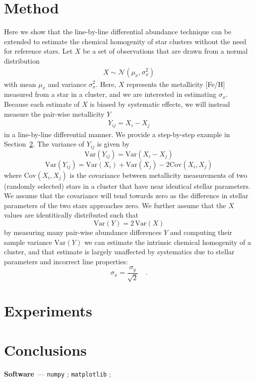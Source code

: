 \documentclass[modern]{aastex631}
\renewcommand{\paragraph}[1]{\medskip\par\noindent\textbf{#1}~---}
\begin{document}
\section{Method} \label{sec:method}
Here we show that the line-by-line differential abundance technique can be extended to estimate the chemical homogenity of star clusters without the need for reference stars. Let ${X}$ be a set of observations that are drawn from a normal distribution
\begin{eqnarray}
   X \sim \mathcal{N}(\mu_x, \sigma_x^2)
\end{eqnarray}
\noindent{}with mean $\mu_x$ and variance $\sigma_x^2$. Here, $X$ represents the metallicity [Fe/H] measured from a star in a cluster, and we are interested in estimating $\sigma_x$. Because each estimate of $X$ is biased by systematic effects, we will instead measure the pair-wise metallicity $Y$
\begin{eqnarray}
    Y_{ij} = X_i - X_j
\end{eqnarray}
\noindent{}in a line-by-line differential manner. We provide a step-by-step example in Section~\ref{sec:experiments}. The variance of $Y_{ij}$ is given by
\begin{equation}
    \mathrm{Var}(Y_{ij}) = \mathrm{Var}(X_i - X_j)
\end{equation}
\begin{equation}
    \mathrm{Var}(Y_{ij}) = \mathrm{Var}(X_i) + \mathrm{Var}(X_j) - 2\mathrm{Cov}(X_i,X_j)
\end{equation}
\noindent{}where $\mathrm{Cov}(X_i,X_j)$ is the covariance between metallicity measurements of two (randomly selected) stars in a cluster that have near identical stellar parameters. We assume that the covariance will tend towards zero as the difference in stellar parameters of the two stars approaches zero. We further assume that the $X$ values are identitically distributed such that 
\begin{equation}
    \mathrm{Var}(Y) = 2\,\mathrm{Var}(X)
\end{equation}
\noindent{}by measuring many pair-wise abundance differences $Y$ and computing their sample variance $\mathrm{Var}(Y)$ we can estimate the intrinsic chemical homogenity of a cluster, and that estimate is largely unaffected by systematics due to stellar parameters and incorrect line properties:
\begin{equation}
    \sigma_x = \frac{\sigma_y}{\sqrt{2}} \quad .
    \label{eq:sigma_x_to_sigma_y}
\end{equation}

\section{Experiments} \label{sec:experiments}




\section{Conclusions} \label{sec:conclusions}


\paragraph{Software}
\texttt{numpy} \citep{numpy}; 
\texttt{matplotlib} \citep{matplotlib}; 



%
\end{document}
